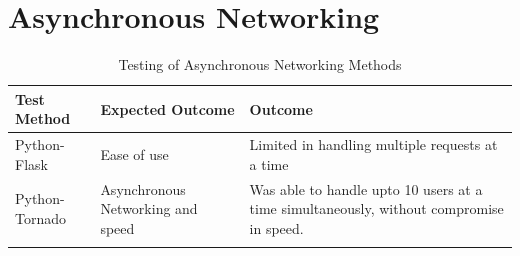 \documentclass{fisatproject}
\begin{document}
\section{Asynchronous Networking}
\begin{longtable}{ | p{5cm} | p{5cm} | p{5cm} |}
      \hline
      \textbf{Test Method} & \textbf{Expected Outcome} & \textbf{Outcome}\\
      \hline
      Python-Flask & Ease of use & Limited in handling multiple requests at a time\\
      \hline
      Python-Tornado & Asynchronous Networking and speed & Was able to handle upto 10 users at a time simultaneously, without compromise in speed.\\
      \hline
\caption{Testing of Asynchronous Networking Methods}
\label{table:3}
\end{longtable}
\end{document}
